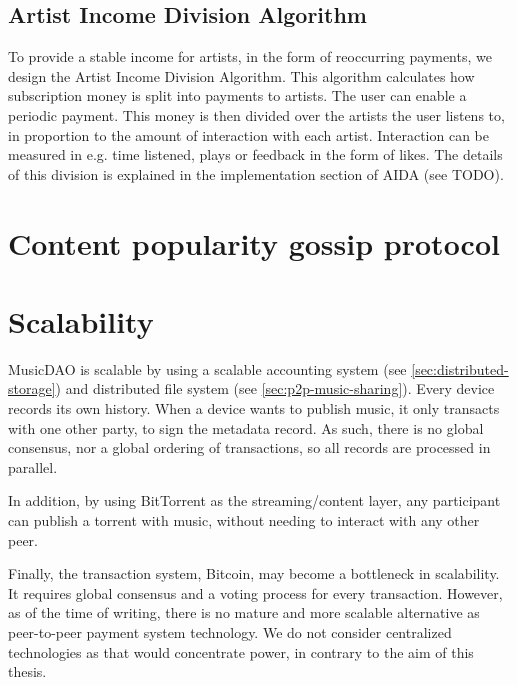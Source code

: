 \subsection{Artist Income Division Algorithm}
\label{sec:aida-design}
To provide a stable income for artists, in the form of reoccurring payments, we design the Artist Income Division Algorithm. This algorithm calculates how subscription money is split into payments to artists. The user can enable a periodic payment. This money is then divided over the artists the user listens to, in proportion to the amount of interaction with each artist. Interaction can be measured in e.g. time listened, plays or feedback in the form of likes. The details of this division is explained in the implementation section of AIDA (see TODO).

\section{Content popularity gossip protocol}

\section{Scalability}
MusicDAO is scalable by using a scalable accounting system (see \ref{sec:distributed-storage}) and distributed file system (see \ref{sec:p2p-music-sharing}). Every device records its own history. When a device wants to publish music, it only transacts with one other party, to sign the metadata record. As such, there is no global consensus, nor a global ordering of transactions, so all records are processed in parallel.

In addition, by using BitTorrent as the streaming/content layer, any participant can publish a torrent with music, without needing to interact with any other peer. 

Finally, the transaction system, Bitcoin, may become a bottleneck in scalability. It requires global consensus and a voting process for every transaction. However, as of the time of writing, there is no mature and more scalable alternative as peer-to-peer payment system technology. We do not consider centralized technologies as that would concentrate power, in contrary to the aim of this thesis.